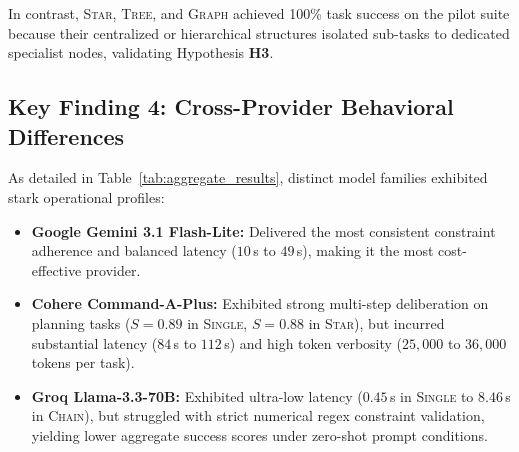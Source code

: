 In contrast, \textsc{Star}, \textsc{Tree}, and \textsc{Graph} achieved 100\% task success on the pilot suite because their centralized or hierarchical structures isolated sub-tasks to dedicated specialist nodes, validating Hypothesis \textbf{H3}.

\subsection{Key Finding 4: Cross-Provider Behavioral Differences}
As detailed in Table~\ref{tab:aggregate_results}, distinct model families exhibited stark operational profiles:
\begin{itemize}
    \item \textbf{Google Gemini 3.1 Flash-Lite:} Delivered the most consistent constraint adherence and balanced latency ($10\,$s to $49\,$s), making it the most cost-effective provider.
    \item \textbf{Cohere Command-A-Plus:} Exhibited strong multi-step deliberation on planning tasks ($S = 0.89$ in \textsc{Single}, $S = 0.88$ in \textsc{Star}), but incurred substantial latency ($84\,$s to $112\,$s) and high token verbosity ($25{,}000$ to $36{,}000$ tokens per task).
    \item \textbf{Groq Llama-3.3-70B:} Exhibited ultra-low latency ($0.45\,$s in \textsc{Single} to $8.46\,$s in \textsc{Chain}), but struggled with strict numerical regex constraint validation, yielding lower aggregate success scores under zero-shot prompt conditions.
\end{itemize}

